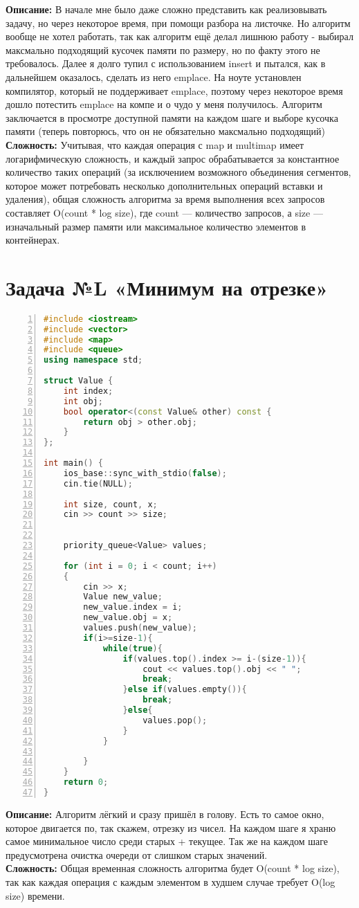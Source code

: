 \documentclass{article}
\newcommand{\descr}[2]{%
    \textbf{Описание: } #1\\
    \textbf{Сложность: } #2
}
\begin{document}
\descr{
    В начале мне было даже сложно представить как реализовывать задачу, но через некоторое время, при помощи разбора на листочке. Но алгоритм вообще не хотел работать, так как алгоритм ещё делал лишнюю работу - выбирал максмально подходящий кусочек памяти по размеру, но по факту этого не требовалось. Далее я долго тупил с использованием insert и пытался, как в дальнейшем оказалось, сделать из него emplace. На ноуте установлен компилятор, который не поддерживает emplace, поэтому через некоторое время дошло потестить emplace на компе и о чудо у меня получилось. Алгоритм заключается в просмотре доступной памяти на каждом шаге и выборе кусочка памяти (теперь повторюсь, что он не обязательно максмально подходящий) 
    }{Учитывая, что каждая операция с map и multimap имеет логарифмическую сложность, и каждый запрос обрабатывается за константное количество таких операций (за исключением возможного объединения сегментов, которое может потребовать несколько дополнительных операций вставки и удаления), общая сложность алгоритма за время выполнения всех запросов составляет O(count * log size), где count — количество запросов, а size — изначальный размер памяти или максимальное количество элементов в контейнерах.}

\section{Задача №L «Минимум на отрезке»}
\begin{lstlisting}[language=C++, frame=single, basicstyle=\ttfamily, numbers=left, numberstyle=\tiny]
#include <iostream>
#include <vector>
#include <map>
#include <queue>
using namespace std;

struct Value {
    int index;
    int obj; 
    bool operator<(const Value& other) const {
        return obj > other.obj;
    }
};

int main() {
    ios_base::sync_with_stdio(false);
    cin.tie(NULL);

    int size, count, x;
    cin >> count >> size;


    priority_queue<Value> values; 

    for (int i = 0; i < count; i++)
    {
        cin >> x;
        Value new_value;
        new_value.index = i;
        new_value.obj = x;
        values.push(new_value);
        if(i>=size-1){
            while(true){
                if(values.top().index >= i-(size-1)){
                    cout << values.top().obj << " ";
                    break;
                }else if(values.empty()){
                    break;
                }else{
                    values.pop();
                }
            }
            
        }
    }
    return 0;
}
\end{lstlisting}
\descr{
     Алгоритм лёгкий и сразу пришёл в голову. Есть то самое окно, которое двигается по, так скажем, отрезку из чисел. На каждом шаге я храню самое минимальное число среди старых + текущее. Так же на каждом шаге предусмотрена очистка очереди от слишком старых значений.
    }{Общая временная сложность алгоритма будет O(count * log size), так как каждая операция с каждым элементом в худшем случае требует O(log size) времени.}
\end{document}
